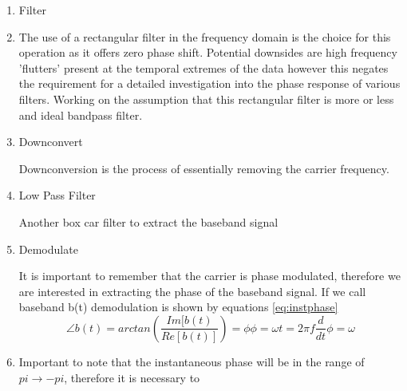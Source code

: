 \begin{enumerate}
    \item Filter

            \item The use of a rectangular filter in the frequency domain is the choice for this operation as it offers zero phase shift. Potential downsides are high frequency 'flutters' present at the temporal extremes of the data however this negates the requirement for a detailed investigation into the phase response of various filters. Working on the assumption that this rectangular filter is more or less and ideal bandpass filter.

    \item Downconvert

            Downconversion is the process of essentially removing the carrier frequency. 

    \item Low Pass Filter

            Another box car filter to extract the baseband signal

    \item Demodulate

            It is important to remember that the carrier is phase modulated, therefore
            we are interested in extracting the phase of the baseband signal. If we call baseband b(t) demodulation is shown by equations \ref{eq:instphase}
            \begin{subequations}
                \begin{equation}
                    \angle b(t) = arctan\left(\frac{Im[b(t)}{Re[b(t)]}\right) = \phi
                \end{equation}
                \begin{equation}
                    \phi = \omega t = 2\pi f
                    \label{eq:omega}
                \end{equation}
                \begin{equation}
                    \frac{d}{dt}\phi = \omega
                    \label{eq:instfeq}
                \end{equation}
                \label{eq:instphase}
            \end{subequations}
            \item Important to note that the instantaneous phase will be in the range of $pi \rightarrow -pi$, therefore it is necessary to
        \end{enumerate}


